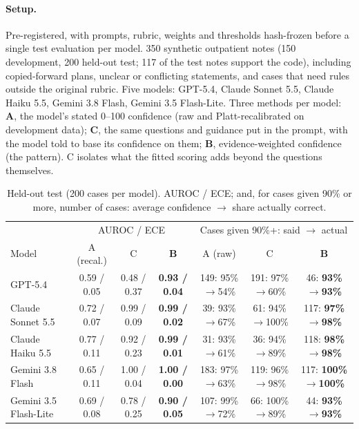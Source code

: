 \documentclass[10pt,letterpaper]{article}
\begin{document}
\paragraph{Setup.} Pre-registered, with prompts, rubric, weights and thresholds hash-frozen before a single test evaluation per model. 350 synthetic outpatient notes (150 development, 200 held-out test; 117 of the test notes support the code), including copied-forward plans, unclear or conflicting statements, and cases that need rules outside the original rubric. Five models: GPT-5.4, Claude Sonnet 5.5, Claude Haiku 5.5, Gemini 3.8 Flash, Gemini 3.5 Flash-Lite. Three methods per model:
\textbf{A}, the model's stated 0--100 confidence (raw and Platt-recalibrated on development data);
\textbf{C}, the same questions and guidance put in the prompt, with the model told to base its confidence on them;
\textbf{B}, evidence-weighted confidence (the pattern).
C isolates what the fitted scoring adds beyond the questions themselves.

\begin{table}[h]
\centering\footnotesize
\caption{Held-out test (200 cases per model). AUROC / ECE; and, for cases given 90\% or more, number of cases: average confidence $\rightarrow$ share actually correct.}\label{tab:main}
\setlength{\tabcolsep}{3.5pt}
\begin{tabular}{@{}lccc|ccc@{}}
\toprule
 & \multicolumn{3}{c|}{AUROC / ECE} & \multicolumn{3}{c}{Cases given 90\%+: said $\rightarrow$ actual} \\
Model & A (recal.) & C & \textbf{B} & A (raw) & C & \textbf{B} \\
\midrule
GPT-5.4 & 0.59 / 0.05 & 0.48 / 0.37 & \textbf{0.93 / 0.04} & 149: 95\%$\rightarrow$54\% & 191: 97\%$\rightarrow$60\% & 46: \textbf{93\%$\rightarrow$93\%} \\
Claude Sonnet 5.5 & 0.72 / 0.07 & 0.99 / 0.09 & \textbf{0.99 / 0.02} & 39: 93\%$\rightarrow$67\% & 61: 94\%$\rightarrow$100\% & 117: \textbf{97\%$\rightarrow$98\%} \\
Claude Haiku 5.5 & 0.77 / 0.11 & 0.92 / 0.23 & \textbf{0.99 / 0.01} & 31: 93\%$\rightarrow$61\% & 36: 94\%$\rightarrow$89\% & 118: \textbf{98\%$\rightarrow$98\%} \\
Gemini 3.8 Flash & 0.65 / 0.11 & 1.00 / 0.04 & \textbf{1.00 / 0.00} & 183: 97\%$\rightarrow$63\% & 119: 96\%$\rightarrow$98\% & 117: \textbf{100\%$\rightarrow$100\%} \\
Gemini 3.5 Flash-Lite & 0.69 / 0.08 & 0.78 / 0.25 & \textbf{0.90 / 0.05} & 107: 99\%$\rightarrow$72\% & 66: 100\%$\rightarrow$89\% & 44: \textbf{93\%$\rightarrow$93\%} \\
\bottomrule
\end{tabular}
\end{table}
\end{document}
